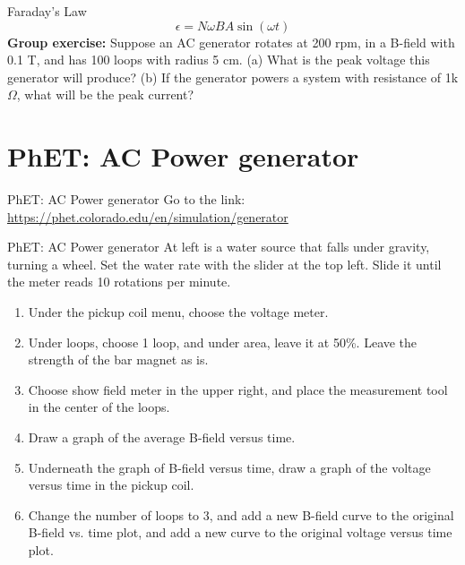 \documentclass{beamer}
\begin{document}
\begin{frame}{Faraday's Law}
\begin{equation}
\epsilon = N\omega BA \sin(\omega t)
\end{equation}
\textbf{Group exercise:} Suppose an AC generator rotates at 200 rpm, in a B-field with 0.1 T, and has 100 loops with radius 5 cm.  (a) What is the peak voltage this generator will produce? (b) If the generator powers a system with resistance of 1k$\Omega$, what will be the peak current?
\end{frame}

\section{PhET: AC Power generator}

\begin{frame}{PhET: AC Power generator}
\small
Go to the link: \\ \vspace{0.5cm}
\url{https://phet.colorado.edu/en/simulation/generator}
\end{frame}

\begin{frame}{PhET: AC Power generator}
\small
At left is a water source that falls under gravity, turning a wheel.  Set the water rate with the slider at the top left.  Slide it until the meter reads 10 rotations per minute.
\begin{enumerate}
\item Under the pickup coil menu, choose the voltage meter.
\item Under loops, choose 1 loop, and under area, leave it at 50\%.  Leave the strength of the bar magnet as is.
\item Choose show field meter in the upper right, and place the measurement tool in the center of the loops.
\item Draw a graph of the average B-field versus time.
\item Underneath the graph of B-field versus time, draw a graph of the voltage versus time in the pickup coil.
\item Change the number of loops to 3, and add a new B-field curve to the original B-field vs. time plot, and add a new curve to the original voltage versus time plot.
\end{enumerate}
\end{frame}
\end{document}
